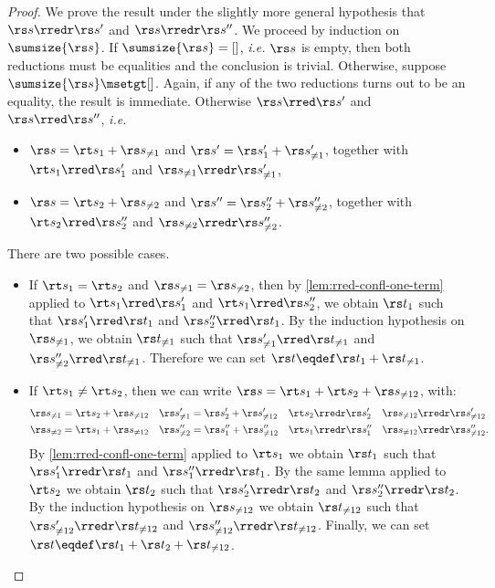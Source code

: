 \documentclass[10pt,a4paper]{amsart}
\theoremstyle{definition}
\begin{document}
	\begin{proof}
	We prove the result under the slightly more general hypothesis
	that $\rs s \rredr \rs s'$ and $\rs s \rredr \rs s''$.
	We proceed by induction on $\sumsize{\rs s}$.
	If $\sumsize{\rs s} = []$, \emph{i.e.} $\rs s$ is empty,
	then both reductions must be equalities
	and the conclusion is trivial.
	Otherwise, suppose $\sumsize{\rs s} \msetgt []$.
	Again, if any of the two reductions
	turns out to be an equality, the result is immediate.
	Otherwise $\rs s \rred \rs s'$ and $\rs s \rred \rs s''$, \emph{i.e.}
	\begin{itemize}
	\item $\rs s = \rt s_1 + \rs s_{\neq 1}$
		and $\rs s' = \rs s'_1 + \rs s'_{\neq 1}$,
		together with $\rt s_1 \rred \rs s'_1$
		and $\rs s_{\neq 1} \rredr \rs s'_{\neq 1}$,
	\item $\rs s = \rt s_2 + \rs s_{\neq 2}$
		and $\rs s'' = \rs s''_2 + \rs s''_{\neq 2}$,
		together with $\rt s_2 \rred \rs s''_2$
		and $\rs s_{\neq 2} \rredr \rs s''_{\neq 2}$.
	\end{itemize}
	There are two possible cases.
	\begin{itemize}
	\item If $\rt s_1 = \rt s_2$ and $\rs s_{\neq 1} = \rs s_{\neq 2}$,
		then by \cref{lem:rred-confl-one-term} applied to
		$\rt s_1 \rred \rs s'_1$ and $\rt s_1 \rred \rs s''_2$,
		we obtain $\rs t_1$ such that
		$\rs s'_1 \rred \rs t_1$ and $\rs s''_2 \rred \rs t_1$.
		By the induction hypothesis on $\rs s_{\neq 1}$,
		we obtain $\rs t_{\neq 1}$ such that
		$\rs s'_{\neq 1} \rred \rs t_{\neq 1}$ 
		and $\rs s''_{\neq 2} \rred \rs t_{\neq 1}$.
		Therefore we can set $\rs t \eqdef \rs t_1 + \rs t_{\neq 1}$.
	\item If $\rt s_1 \neq \rt s_2$, then we can write
		$\rs s = \rt s_1 + \rt s_2 + \rs s_{\neq 12}$, with:
		\begin{align*}
			\rs s_{\neq 1} & = \rt s_2 + \rs s_{\neq 12} &
			\rs s'_{\neq 1} & = \rs s'_2 + \rs s'_{\neq 12} &
			\rt s_2 & \rredr \rs s'_2 &
			\rs s_{\neq 12} & \rredr \rs s'_{\neq 12} \\
			\rs s_{\neq 2} & = \rt s_1 + \rs s_{\neq 12} &
			\rs s''_{\neq 2} & = \rs s''_1 + \rs s''_{\neq 12} &
			\rt s_1 & \rredr \rs s''_1 &
			\rs s_{\neq 12} & \rredr \rs s''_{\neq 12}.
		\end{align*}
		By \cref{lem:rred-confl-one-term} applied to $\rt s_1$
		we obtain $\rs t_1$ such that
		$\rs s'_1 \rredr \rs t_1$ and $\rs s''_1 \rredr \rs t_1$.
		By the same lemma applied to $\rt s_2$
		we obtain $\rs t_2$ such that
		$\rs s'_2 \rredr \rs t_2$ and $\rs s''_2 \rredr \rs t_2$.
		By the induction hypothesis on $\rs s_{\neq 12}$
		we obtain $\rs t_{\neq 12}$ such that
		$\rs s'_{\neq 12} \rredr \rs t_{\neq 12}$
		and $\rs s''_{\neq 12} \rredr \rs t_{\neq 12}$.
		Finally, we can set $\rs t \eqdef 
		\rs t_1 + \rs t_2 + \rs t_{\neq 12}$.
	\qedhere
	\end{itemize}
	\end{proof}
\end{document}
